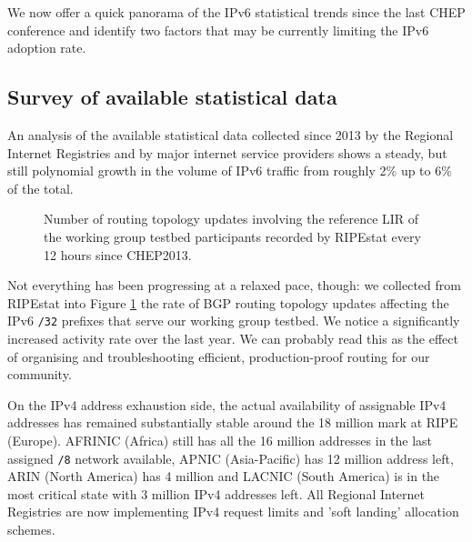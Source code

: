 We now offer a quick panorama of the IPv6 statistical trends since the last
CHEP conference and identify two factors that may be currently limiting 
the IPv6 adoption rate. 
\subsection{Survey of available statistical data}
An analysis of the available statistical data collected since 2013
by the Regional Internet Registries \cite{ripeipv6,arinstat,apnicstat,afrinicipv6,lacnicipc6} and by major internet
service providers \cite{akamaistats,googlestats} shows a steady, but
still polynomial growth in the volume of IPv6 traffic from roughly 
2\% up to 6\% of the total. 
\begin{figure} [h]
\centering
\def\svgwidth{\columnwidth}

\caption{Number of routing topology updates involving the reference LIR of the working group testbed participants recorded by RIPEstat \cite{ripestat} every 12 hours since CHEP2013.}
\label{fig:bgpupdates}
\end{figure}
Not everything has been progressing at a relaxed pace, though: we collected from RIPEstat \cite{ripestat} into Figure \ref{fig:bgpupdates} the
rate of BGP routing topology updates affecting
the IPv6 {\tt/32} prefixes that serve our
working group testbed. We notice a significantly increased activity rate over the
last year. We can probably read this as the effect of organising and troubleshooting efficient, production-proof routing for our community.\par
On the IPv4 address exhaustion side, the actual availability of
assignable IPv4 addresses has remained substantially stable around the 18 million mark at RIPE (Europe). AFRINIC (Africa) still has all the 16 million addresses in the last assigned {\tt /8} network available, APNIC (Asia-Pacific) has 12 million address left, ARIN (North America) has 4 million and LACNIC (South America) is in
the most critical state with 3 million IPv4 addresses left.
All Regional Internet Registries are
now implementing IPv4 request limits and 'soft landing' allocation schemes.
